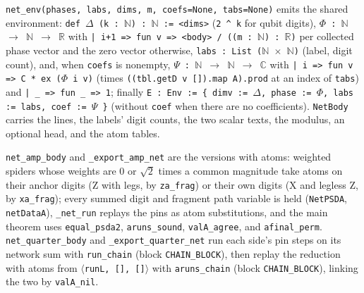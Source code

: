\noindent \textnormal{\texttt{net\_\allowbreak{}env(\allowbreak{}phases,\allowbreak{} labs,\allowbreak{} dims,\allowbreak{} m,\allowbreak{} coefs=None,\allowbreak{} tabs=None)}} emits the shared environment:
\textnormal{\texttt{def \ensuremath{\Delta} (\allowbreak{}k : \ensuremath{\mathbb{N}}) : \ensuremath{\mathbb{N}} := <dims>}} (\textnormal{\texttt{2 \^{} k}} for qubit digits), \textnormal{\texttt{\ensuremath{\Phi} : \ensuremath{\mathbb{N}} \ensuremath{\to} \ensuremath{\mathbb{N}} \ensuremath{\to} \ensuremath{\mathbb{R}}}} with
\textnormal{\texttt{| i+1 => fun v => <body> / (\allowbreak{}(\allowbreak{}m : \ensuremath{\mathbb{N}}) : \ensuremath{\mathbb{R}})}} per collected phase vector and the zero vector
otherwise, \textnormal{\texttt{labs : List (\allowbreak{}\ensuremath{\mathbb{N}} \ensuremath{\times} \ensuremath{\mathbb{N}})}} (label, digit count), and, when \textnormal{\texttt{coefs}} is nonempty,
\textnormal{\texttt{\ensuremath{\Psi} : \ensuremath{\mathbb{N}} \ensuremath{\to} \ensuremath{\mathbb{N}} \ensuremath{\to} \ensuremath{\mathbb{C}}}} with \textnormal{\texttt{| i => fun v => C * ex (\allowbreak{}\ensuremath{\Phi} i v)}} (times
\textnormal{\texttt{(\allowbreak{}(\allowbreak{}tbl.\allowbreak{}getD v []).\allowbreak{}map A).\allowbreak{}prod}} at an index of \textnormal{\texttt{tabs}}) and \textnormal{\texttt{| \_\allowbreak{} => fun \_\allowbreak{} => 1}}; finally
\textnormal{\texttt{E : Env := \{ dimv := \ensuremath{\Delta},\allowbreak{} phase := \ensuremath{\Phi},\allowbreak{} labs := labs,\allowbreak{} coef := \ensuremath{\Psi} \}}} (without \textnormal{\texttt{coef}} when
there are no coefficients). \textnormal{\texttt{NetBody}} carries the lines, the labels' digit counts, the two
scalar texts, the modulus, an optional head, and the atom tables.

\textnormal{\texttt{net\_\allowbreak{}amp\_\allowbreak{}body}} and \textnormal{\texttt{\_\allowbreak{}export\_\allowbreak{}amp\_\allowbreak{}net}} are the versions with atoms: weighted spiders whose
weights are $0$ or $\sqrt2$ times a common magnitude take atoms on their anchor digits (Z with
legs, by \textnormal{\texttt{za\_\allowbreak{}frag}}) or their own digits (X and legless Z, by \textnormal{\texttt{xa\_\allowbreak{}frag}}); every summed
digit and fragment path variable is held (\textnormal{\texttt{NetPSDA}}, \textnormal{\texttt{netDataA}}), \textnormal{\texttt{\_\allowbreak{}net\_\allowbreak{}run}} replays the
pins as atom substitutions, and the main theorem uses \textnormal{\texttt{equal\_\allowbreak{}psda2}}, \textnormal{\texttt{aruns\_\allowbreak{}sound}},
\textnormal{\texttt{valA\_\allowbreak{}agree}}, and \textnormal{\texttt{afinal\_\allowbreak{}perm}}. \textnormal{\texttt{net\_\allowbreak{}quarter\_\allowbreak{}body}} and \textnormal{\texttt{\_\allowbreak{}export\_\allowbreak{}quarter\_\allowbreak{}net}}
run each side's pin steps on its network sum with \textnormal{\texttt{run\_\allowbreak{}chain}} (block \textnormal{\texttt{CHAIN\_\allowbreak{}BLOCK}}), then
replay the reduction with atoms from \textnormal{\texttt{\ensuremath{\langle}runL,\allowbreak{} [],\allowbreak{} []\ensuremath{\rangle}}} with \textnormal{\texttt{aruns\_\allowbreak{}chain}} (block
\textnormal{\texttt{CHAIN\_\allowbreak{}BLOCK}}), linking the two by \textnormal{\texttt{valA\_\allowbreak{}nil}}.

